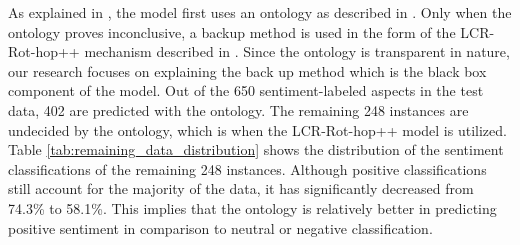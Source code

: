 As explained in \cite{Trusca}, the model first uses an ontology as described in \cite{Schouten}. Only when the ontology proves inconclusive, a backup method is used in the form of the LCR-Rot-hop++ mechanism described in \cite{Trusca}. Since the ontology is transparent in nature, our research focuses on explaining the back up method which is the black box component of the model. Out of the 650 sentiment-labeled aspects in the test data, 402 are predicted with the ontology. The remaining 248 instances are undecided by the ontology, which is when the LCR-Rot-hop++ model is utilized. Table \ref{tab:remaining_data_distribution} shows the distribution of the sentiment classifications of the remaining 248 instances. Although positive classifications still account for the majority of the data, it has significantly decreased from 74.3\% to 58.1\%. This implies that the ontology is relatively better in predicting positive sentiment in comparison to neutral or negative classification. 